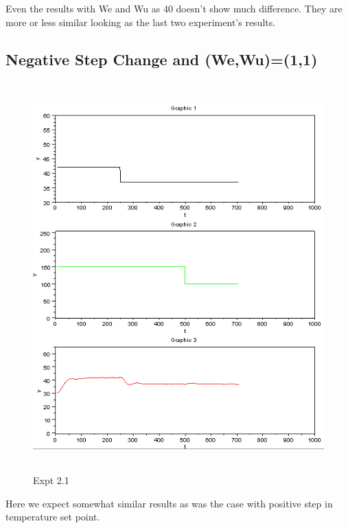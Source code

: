 Even the results with We and Wu as 40 doesn't show much difference. They are more or less similar looking as the last two experiment's results.


\subsection{Negative Step Change and (We,Wu)=(1,1)}
\begin{figure}[H]
  \includegraphics[width=12cm, height=15cm]{mpc/2_1.PNG}
  \caption{Expt 2.1}
\end{figure}
Here we expect somewhat similar results as was the case with positive step in temperature set point.
